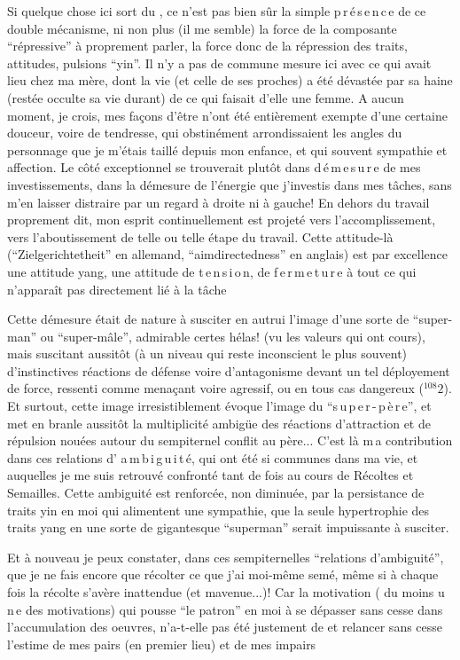 
Si quelque chose ici sort du , ce n'est pas bien sûr la simple p\,r\,é\,s\,e\,n\,c\,e de ce double mécanisme, ni non plus (il me semble) la force de la composante ``répressive'' à proprement parler, la force donc de la répression des traits, attitudes, pulsions ``yin''. Il n'y a pas de commune mesure ici avec ce qui avait lieu chez ma mère, dont la vie (et celle de ses proches) a été dévastée par sa haine (restée occulte sa vie durant) de ce qui faisait d'elle une femme. A aucun moment, je crois, mes façons d'être n'ont été entièrement exempte d'une certaine douceur, voire de tendresse, qui obstinément arrondissaient les angles du personnage que je m'étais taillé depuis mon enfance, et qui  souvent sympathie et affection. Le côté exceptionnel se trouverait plutôt dans  d\,é\,m\,e\,s\,u\,r\,e de mes investissements, dans la démesure de l'énergie que j'investis dans mes tâches, sans m'en laisser distraire par un regard à droite ni à gauche! En dehors du travail proprement dit, mon esprit continuellement est projeté vers l'accomplissement, vers l'aboutissement de telle ou telle étape du travail. Cette attitude-là (``Zielgerichtetheit'' en allemand, ``aimdirectedness'' en anglais) est par excellence une attitude yang, une attitude de t\,e\,n\,s\,i\,o\unsure{:|}\,n, de f\,e\,r\,m\,e\,t\,u\,r\,e à tout ce qui n'apparaît pas directement lié à la tâche

Cette démesure était de nature à susciter en autrui l'image d'une sorte de ``super-man'' ou ``super-mâle'', admirable certes hélas! (vu les valeurs qui ont cours), mais suscitant aussitôt (à un niveau qui reste inconscient le plus souvent) d'instinctives réactions de défense voire d'antagonisme devant un tel déployement de force, ressenti comme menaçant voire agressif, ou en tous cas dangereux (\({}^{108}2\)). Et surtout, cette image irresistiblement évoque l'image du ``s\,u\,p\,e\,r\,-\,p\,è\,r\,e'', et met en branle aussitôt la multiplicité ambigüe des réactions d'attraction et de répulsion nouées autour\unsure{:|} du sempiternel conflit au père... C'est là \unsure{:|}m\,a contribution dans ces relations d' a\,m\,b\,i\,g\,u\,i\,t\,é, qui ont été si communes dans ma vie, et auquelles je me suis retrouvé confronté tant de fois au cours de Récoltes et Semailles. Cette ambiguité est renforcée, non diminuée, par la persistance de traits yin en moi qui alimentent une sympathie, que la seule hypertrophie des traits yang en une sorte de gigantesque ``superman'' serait impuissante à susciter.

Et à nouveau je peux constater, dans ces sempiternelles ``relations d'ambiguité'', que je ne fais encore que récolter ce que j'ai moi-même semé, même si à chaque fois la récolte s'avère inattendue (et mavenue...)! Car la motivation ( du moins u\,n\,e des motivations) qui pousse ``le patron'' en moi à se dépasser sans cesse dans l'accumulation des oeuvres, n'a-t-elle pas été justement de  et relancer sans cesse l'estime de mes pairs (en premier lieu) et de mes impairs
